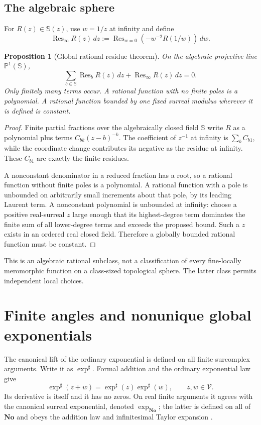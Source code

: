 \documentclass[11pt,a4paper]{article}
\newtheorem{proposition}[theorem]{Proposition}
\theoremstyle{definition}
\theoremstyle{remark}
\newcommand{\No}{\mathbf{No}}
\newcommand{\SC}{\mathbb S}
\newcommand{\Fin}{\mathcal V}
\newcommand{\Res}{\operatorname{Res}}
\begin{document}
\subsection{The algebraic sphere}
For $R(z)\in\SC(z)$, use $w=1/z$ at infinity and define
\[
 \Res_\infty R(z)\,dz
    :=\Res_{w=0}\left(-w^{-2}R(1/w)\right)\,dw.
\]

\begin{proposition}[Global rational residue theorem]\label{prop:rational}
On the algebraic projective line $\mathbb P^1(\SC)$,
\[
 \sum_{b\in\SC}\Res_b R(z)\,dz+\Res_\infty R(z)\,dz=0.
\]
Only finitely many terms occur. A rational function with no finite
poles is a polynomial. A rational function bounded by one fixed
surreal modulus wherever it is defined is constant.
\end{proposition}
\begin{proof}
Finite partial fractions over the algebraically closed field $\SC$
write $R$ as a polynomial plus terms $C_{bk}(z-b)^{-k}$. The
coefficient of $z^{-1}$ at infinity is $\sum_b C_{b1}$, while the
coordinate change contributes its negative as the residue at infinity.
These $C_{b1}$ are exactly the finite residues.

A nonconstant denominator in a reduced fraction has a root, so a
rational function without finite poles is a polynomial. A rational
function with a pole is unbounded on arbitrarily small increments
about that pole, by its leading Laurent term. A nonconstant polynomial
is unbounded at infinity: choose a positive real-surreal $z$ large
enough that its highest-degree term dominates the finite sum of all
lower-degree terms and exceeds the proposed bound. Such a $z$ exists
in an ordered real closed field. Therefore a globally bounded rational
function must be constant.
\end{proof}
This is an algebraic rational subclass, not a classification of every
fine-locally meromorphic function on a class-sized topological sphere.
The latter class permits independent local choices.

\section{Finite angles and nonunique global exponentials}\label{sec:exponential}
The canonical lift of the ordinary exponential is defined on all
finite surcomplex arguments. Write it as $\exp^\sharp$. Formal
addition and the ordinary exponential law give
\[
 \exp^\sharp(z+w)=\exp^\sharp(z)\exp^\sharp(w),
 \qquad z,w\in\Fin.
\]
Its derivative is itself and it has no zeros. On real finite arguments
it agrees with the canonical surreal exponential, denoted
$\exp_{\No}$; the latter is defined on all of $\No$ and obeys the
addition law and infinitesimal Taylor expansion \cite{vdDE}.
\end{document}
